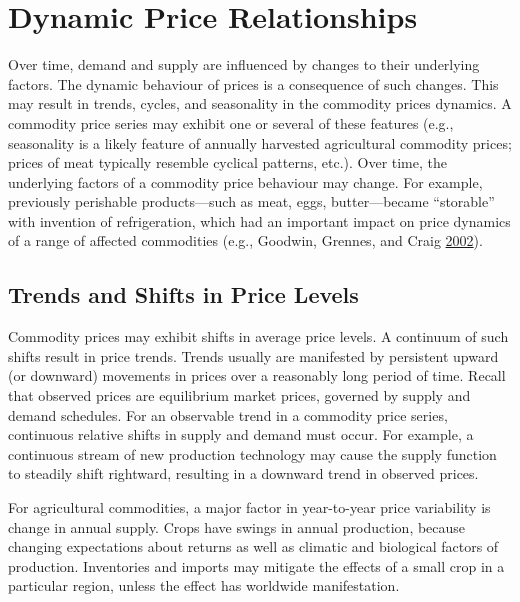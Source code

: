 \documentclass[
]{book}
\begin{document}
\hypertarget{dynamic-price-relationships}{%
\chapter{Dynamic Price Relationships}\label{dynamic-price-relationships}}

Over time, demand and supply are influenced by changes to their underlying factors. The dynamic behaviour of prices is a consequence of such changes. This may result in trends, cycles, and seasonality in the commodity prices dynamics. A commodity price series may exhibit one or several of these features (e.g., seasonality is a likely feature of annually harvested agricultural commodity prices; prices of meat typically resemble cyclical patterns, etc.). Over time, the underlying factors of a commodity price behaviour may change. For example, previously perishable products---such as meat, eggs, butter---became ``storable'' with invention of refrigeration, which had an important impact on price dynamics of a range of affected commodities (e.g., Goodwin, Grennes, and Craig \protect\hyperlink{ref-goodwin2002}{2002}).

\hypertarget{trends-and-shifts-in-price-levels}{%
\section{Trends and Shifts in Price Levels}\label{trends-and-shifts-in-price-levels}}

Commodity prices may exhibit shifts in average price levels. A continuum of such shifts result in price trends. Trends usually are manifested by persistent upward (or downward) movements in prices over a reasonably long period of time. Recall that observed prices are equilibrium market prices, governed by supply and demand schedules. For an observable trend in a commodity price series, continuous relative shifts in supply and demand must occur. For example, a continuous stream of new production technology may cause the supply function to steadily shift rightward, resulting in a downward trend in observed prices.

For agricultural commodities, a major factor in year-to-year price variability is change in annual supply. Crops have swings in annual production, because changing expectations about returns as well as climatic and biological factors of production. Inventories and imports may mitigate the effects of a small crop in a particular region, unless the effect has worldwide manifestation.
\end{document}
